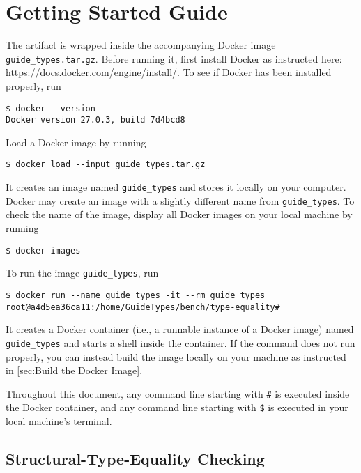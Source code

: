 
\section{Getting Started Guide}

The artifact is wrapped inside the accompanying Docker image
\texttt{guide\_types.tar.gz}.
%
Before running it, first install Docker as instructed here:
\url{https://docs.docker.com/engine/install/}.
%
To see if Docker has been installed properly, run
\begin{verbatim}
$ docker --version
Docker version 27.0.3, build 7d4bcd8
\end{verbatim}

Load a Docker image by running
\begin{verbatim}
$ docker load --input guide_types.tar.gz
\end{verbatim}
%
It creates an image named \texttt{guide\_types} and stores it locally on your
computer.
%
Docker may create an image with a slightly different name from
\texttt{guide\_types}.
%
To check the name of the image, display all Docker images on your local machine
by running
\begin{verbatim}
$ docker images
\end{verbatim}

To run the image \texttt{guide\_types}, run
\begin{verbatim}
$ docker run --name guide_types -it --rm guide_types
root@a4d5ea36ca11:/home/GuideTypes/bench/type-equality#
\end{verbatim}
%
It creates a Docker container (i.e., a runnable instance of a Docker image)
named \texttt{guide\_types} and starts a shell inside the container.
%
If the command does not run properly, you can instead build the image locally on
your machine as instructed in \cref{sec:Build the Docker Image}.

Throughout this document, any command line starting with \texttt{\#} is executed
inside the Docker container, and any command line starting with \texttt{\$} is
executed in your local machine's terminal.

\subsection{Structural-Type-Equality Checking}

